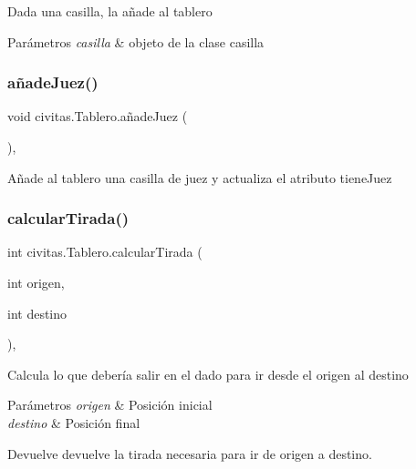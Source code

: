 Dada una casilla, la añade al tablero 
\begin{DoxyParams}{Parámetros}
{\em casilla} & objeto de la clase casilla \\
\hline
\end{DoxyParams}
\mbox{\label{classcivitas_1_1Tablero_aa24e01bfb4a1067c045fd3a31d46b44b}} 
\subsubsection{\texorpdfstring{añade\+Juez()}{añadeJuez()}}
{\footnotesize\ttfamily void civitas.\+Tablero.\+añade\+Juez (\begin{DoxyParamCaption}{ }\end{DoxyParamCaption})\hspace{0.3cm}{\ttfamily [inline]}, {\ttfamily [package]}}

Añade al tablero una casilla de juez y actualiza el atributo tiene\+Juez \mbox{\label{classcivitas_1_1Tablero_a3951d29981cfc2117153df6908d98ad8}} 
\subsubsection{\texorpdfstring{calcular\+Tirada()}{calcularTirada()}}
{\footnotesize\ttfamily int civitas.\+Tablero.\+calcular\+Tirada (\begin{DoxyParamCaption}\item[{int}]{origen,  }\item[{int}]{destino }\end{DoxyParamCaption})\hspace{0.3cm}{\ttfamily [inline]}, {\ttfamily [package]}}

Calcula lo que debería salir en el dado para ir desde el origen al destino 
\begin{DoxyParams}{Parámetros}
{\em origen} & Posición inicial \\
\hline
{\em destino} & Posición final \\
\hline
\end{DoxyParams}
\begin{DoxyReturn}{Devuelve}
devuelve la tirada necesaria para ir de origen a destino. 
\end{DoxyReturn}
\mbox{\label{classcivitas_1_1Tablero_a894ba149d31edaec5b8e1917931b831c}} 
